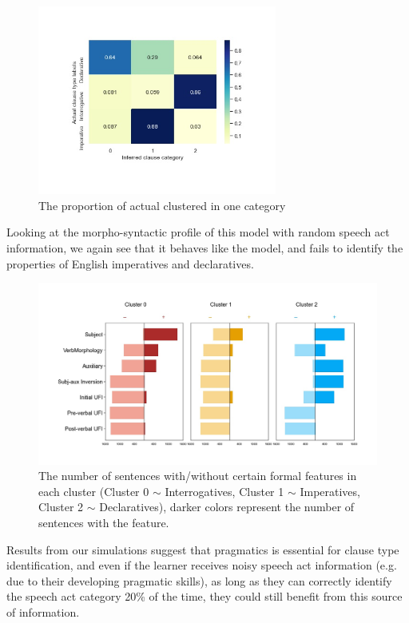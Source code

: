 \begin{figure}[H]
    \centering
    \includegraphics[width=0.7\textwidth]{figures/noisy100-heatrev.jpg}
    \caption{The proportion of actual \diis{} clustered in one category}
    \label{fig:noisy100-heatrev}
\end{figure}

Looking at the morpho-syntactic profile of this model with random speech act information, we again see that it behaves like the \dlearnerabbr{} model, and fails to identify the properties of English imperatives and declaratives.

\begin{figure}[H]
    \centering
    \includegraphics[width=1\textwidth]{figures/noisy100-syncluster.jpg}
    \caption{The number of sentences with/without certain formal features in each cluster (Cluster 0 $\sim$ Interrogatives, Cluster 1 $\sim$ Imperatives, Cluster 2 $\sim$ Declaratives), darker colors represent the number of sentences with the feature.}
    \label{fig:noisy100-syncluster}
\end{figure}

Results from our simulations suggest that pragmatics is essential for clause type identification, and even if the learner receives noisy speech act information (e.g. due to their developing pragmatic skills), as long as they can correctly identify the speech act category 20\% of the time, they could still benefit from this source of information.

